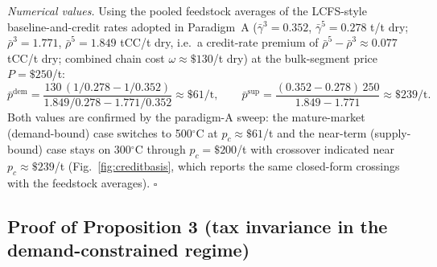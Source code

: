 \emph{Numerical values.} Using the pooled feedstock averages of the
LCFS-style baseline-and-credit rates adopted in Paradigm~A
($\bar{\gamma}^{3}=0.352$, $\bar{\gamma}^{5}=0.278$ t/t dry;
$\bar{\rho}^{3}=1.771$, $\bar{\rho}^{5}=1.849$ tCC/t dry, i.e.\ a
credit-rate premium of $\bar{\rho}^{5}-\bar{\rho}^{3}\approx 0.077$ tCC/t
dry; combined chain cost $\omega\approx\$130$/t dry) at the bulk-segment
price $P=\$250$/t:
\begin{equation}
\bar{p}^{\mathrm{dem}}
=\frac{130\,(1/0.278-1/0.352)}{1.849/0.278-1.771/0.352}
\approx\$61/\mathrm{t},\qquad
\bar{p}^{\mathrm{sup}}
=\frac{(0.352-0.278)\,250}{1.849-1.771}
\approx\$239/\mathrm{t}.
\end{equation}
Both values are confirmed by the paradigm-A sweep: the mature-market
(demand-bound) case switches to 500$^\circ$C at $p_c\approx\$61$/t and the
near-term (supply-bound) case stays on 300$^\circ$C through $p_c=\$200$/t with
crossover indicated near $p_c\approx\$239$/t (Fig.~\ref{fig:creditbasis},
which reports the same closed-form crossings with the feedstock averages).
$\square$

\subsection{Proof of Proposition 3 (tax invariance in the demand-constrained regime)}

